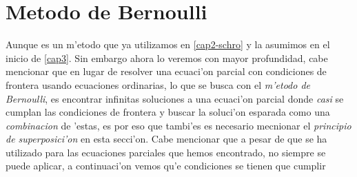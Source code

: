 \documentclass[main.tex]{subfiles}
\begin{document}
\section{Metodo de Bernoulli}
\noindent Aunque es un m'etodo que ya utilizamos en \ref{cap2-schro} y la asumimos en el inicio de \ref{cap3}. Sin embargo ahora lo veremos con mayor profundidad, cabe mencionar que en lugar de resolver una ecuaci'on parcial con condiciones de frontera usando ecuaciones ordinarias, lo que se busca con el \emph{m'etodo de Bernoulli}, es encontrar infinitas soluciones a una ecuaci'on parcial donde \textit{casi} se cumplan las condiciones de frontera y buscar la soluci'on esparada como una \emph{combinacion} de 'estas, es por eso que tambi'es es necesario mecnionar el \emph{principio de superposici'on} en esta secci'on. Cabe mencionar que a pesar de que se ha utilizado para las ecuaciones parciales que hemos encontrado, no siempre se puede aplicar, a continuaci'on vemos qu'e condiciones se tienen que cumplir
\end{document}
